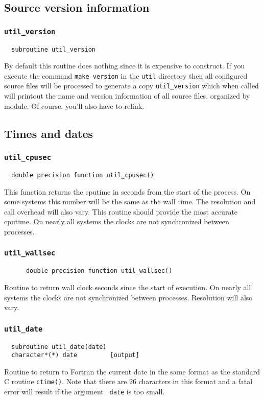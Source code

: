 \subsection{Source version information}

\subsubsection{{\tt util\_version}}
\begin{verbatim}
  subroutine util_version
\end{verbatim}
By default this routine does nothing since it is expensive to
construct.  If you execute the command {\tt make version} in the
{\tt util} directory then all configured source files will be
processed to generate a copy \verb+util_version+ which when called
will printout the name and version information of all source files,
organized by module.  Of course, you'll also have to relink.

\subsection{Times and dates}

\subsubsection{{\tt util\_cpusec}}
\begin{verbatim}
  double precision function util_cpusec()
\end{verbatim}
This function returns the cputime in seconds from the start of the
process.  On some systems this number will be the same as the wall
time. The resolution and call overhead will also vary.  This routine
should provide the most accurate cputime.  On nearly all systems the
clocks are not synchronized between processes.

\subsubsection{{\tt util\_wallsec}}
\begin{verbatim}
      double precision function util_wallsec()
\end{verbatim}
Routine to return wall clock seconds since the start of execution.  On
nearly all systems the clocks are not synchronized between processes.
Resolution will also vary.

\subsubsection{{\tt util\_date}}
\begin{verbatim}
  subroutine util_date(date)
  character*(*) date         [output]
\end{verbatim}
Routine to return to Fortran the current date in the same format as the
standard C routine {\tt ctime()}.  Note that there are 26 characters
in this format and a fatal error will result if the argument {\tt
  date} is too small.

